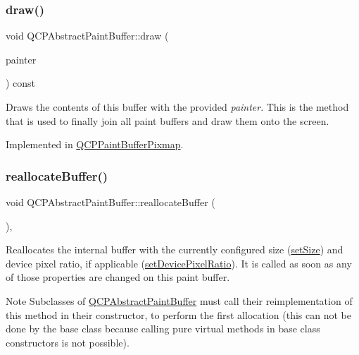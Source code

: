 \subsubsection{\texorpdfstring{draw()}{draw()}}
{\footnotesize\ttfamily void Q\+C\+P\+Abstract\+Paint\+Buffer\+::draw (\begin{DoxyParamCaption}\item[{\hyperlink{class_q_c_p_painter}{Q\+C\+P\+Painter} $\ast$}]{painter }\end{DoxyParamCaption}) const\hspace{0.3cm}{\ttfamily [pure virtual]}}

Draws the contents of this buffer with the provided {\itshape painter}. This is the method that is used to finally join all paint buffers and draw them onto the screen. 

Implemented in \hyperlink{class_q_c_p_paint_buffer_pixmap_af7bfc685e56a0a9329e57cd9a265eb74}{Q\+C\+P\+Paint\+Buffer\+Pixmap}.

\mbox{\label{class_q_c_p_abstract_paint_buffer_aee7506a52bd7e5a07c2af27935eb13e7}} 
\subsubsection{\texorpdfstring{reallocate\+Buffer()}{reallocateBuffer()}}
{\footnotesize\ttfamily void Q\+C\+P\+Abstract\+Paint\+Buffer\+::reallocate\+Buffer (\begin{DoxyParamCaption}{ }\end{DoxyParamCaption})\hspace{0.3cm}{\ttfamily [protected]}, {}}

Reallocates the internal buffer with the currently configured size (\hyperlink{class_q_c_p_abstract_paint_buffer_a8b68c3cd36533f1a4a23b5ce8cd66f01}{set\+Size}) and device pixel ratio, if applicable (\hyperlink{class_q_c_p_abstract_paint_buffer_a555eaad5d5c806420ff35602a1bb68fa}{set\+Device\+Pixel\+Ratio}). It is called as soon as any of those properties are changed on this paint buffer.

\begin{DoxyNote}{Note}
Subclasses of \hyperlink{class_q_c_p_abstract_paint_buffer}{Q\+C\+P\+Abstract\+Paint\+Buffer} must call their reimplementation of this method in their constructor, to perform the first allocation (this can not be done by the base class because calling pure virtual methods in base class constructors is not possible). 
\end{DoxyNote}



